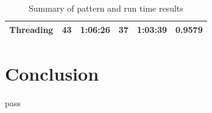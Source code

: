 \documentclass[12pt]{article}
\begin{document}
\begin{table}[ht]
{\begin{tabular}{|l|l|l|l|l|l|}
\textbf{Threading}       & 43                                                                       & 1:06:26                                                                        & 37                                                                                        & 1:03:39                                                                         & 0.9579                                                                           \\ \hline
\end{tabular}
}
\caption{\label{result_table}
    Summary of pattern and run time results
}
\end{table}

\section{Conclusion}
pass

\pagebreak


\end{document}
